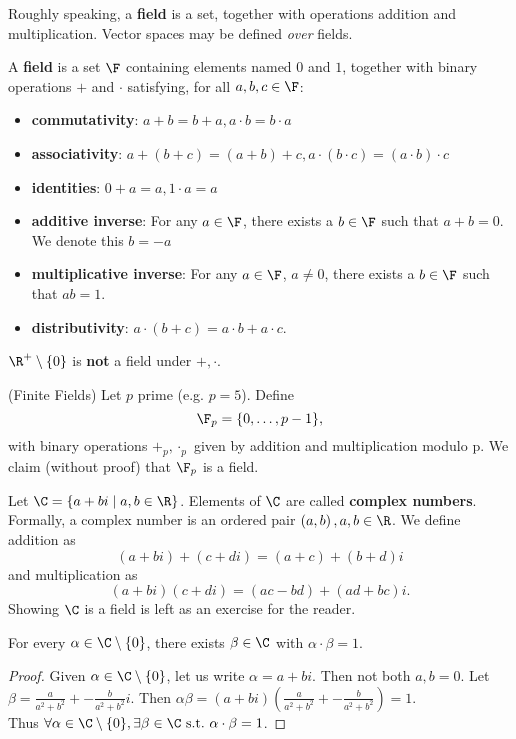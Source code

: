 \documentclass[math0540-lecture-notes.tex]{subfiles}
\begin{document}
Roughly speaking, a \textbf{field} is a set, together with operations addition and multiplication.
Vector spaces may be defined \textit{over} fields.
\begin{definition}[Fields]{}
  A \textbf{field} is a set $\F$ containing elements named $0$ and $1$, together with binary
  operations $+$ and $\cdot $ satisfying, for all $a,b,c\in \F$:
  \begin{itemize}
    \item \textbf{commutativity}: $a+b=b+a, a\cdot b=b\cdot a$
    \item \textbf{associativity}: $a+(b+c)=(a+b)+c, a\cdot \left( b\cdot c \right) =\left( a\cdot b
      \right) \cdot c$
    \item \textbf{identities}: $0+a=a, 1\cdot a=a$
    \item \textbf{additive inverse}: For any $a\in \F$, there exists a $b\in \F$ such that $a+b=0$.
      We denote this $b=-a$
    \item \textbf{multiplicative inverse}: For any $a\in \F$, $a\neq 0$, there exists a $b\in \F$
      such that $ab=1$.
    \item \textbf{distributivity}: $a\cdot (b+c) = a\cdot b+a\cdot c$.
  \end{itemize}
\end{definition}
\begin{example}
  $\R^{+}\setminus \{ 0 \}$ is \textbf{not} a field under $+,\cdot $.
\end{example}

\begin{example}
  (Finite Fields) Let $p$ prime (e.g. $p=5$). Define \[
      \F_p = \{0,\ldots,p-1\} 
  ,\] with binary operations $+_p,\cdot_p $ given by addition and multiplication modulo p. We claim
  (without proof) that $\F_p$ is a field.
\end{example}

\begin{example}
  Let $\C=\{a+bi\mid a,b\in \R\} $. Elements of $\C$ are called \textbf{complex numbers}. Formally,
  a complex number is an ordered pair $\left( a,b \right),a,b\in \R$. We define addition as \[
    (a+bi)+(c+di) = (a+c)+(b+d)i
  \] and multiplication as \[
  (a+bi)(c+di) = (ac-bd)+(ad+bc)i
  .\] 
  Showing $ \C$ is a field is left as an exercise for the reader.
\end{example}
\begin{proposition}{}
  For every $\alpha\in \C\setminus \{ 0 \}$, there exists $\beta\in \C$ with $\alpha\cdot \beta=1$.
\end{proposition}
\begin{proof}[Proof]
  Given $\alpha\in \C\setminus \{ 0 \}$, let us write $ \alpha=a+bi$. Then not both $a,b=0$. Let
  $\beta=\frac{a}{a^2+b^2}+-\frac{b}{a^2+b^2}i$. Then $\alpha\beta=(a+bi)\left( \frac{a}{a^2+b^2}
  +-\frac{b}{a^2+b^2}\right) =1$. \\
  Thus $\forall \alpha\in \C\setminus \{ 0 \}, \exists \beta\in \C ~\text{s.t.}~\alpha\cdot \beta=1$.
\end{proof}
\end{document}
